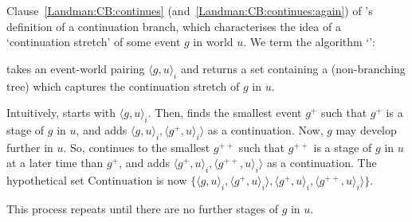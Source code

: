 \begin{note}[\AlgAC{}]
  Clause~\ref{Landman:CB:continues} (and~\ref{Landman:CB:continues:again}) of \citeauthor{Landman:1992wh}'s definition of a continuation branch, which characterises the idea of a `continuation stretch' of some event \(g\) in world \(u\).
  We term the algorithm `\AlgAC{}':

  \begin{algorithm}[H]
    \label{PrAl:g-a-c}
    \caption{\AlgAC{}}
    \SetAlgoLined
    \DontPrintSemicolon
  \end{algorithm}

  \AlgAC{} takes an event-world pairing \(\langle g,u \rangle_{i}\) and returns a set containing a (non-branching tree) which captures the continuation stretch of \(g\) in \(u\).

  Intuitively, \AlgAC{} starts with \(\langle g,u \rangle_{i}\).
  Then, \AlgAC{} finds the smallest event \(g^{+}\) such that \(g^{+}\) is a stage of \(g\) in \(u\), and adds \(\langle g,u \rangle_{i}, \langle g^{+},u \rangle_{i} \rangle\) as a continuation.
  Now, \(g\) may develop further in \(u\).
  So, \AlgAC{} continues to the smallest \(g^{++}\) such that \(g^{++}\) is a stage of \(g\) in \(u\) at a later time than \(g^{+}\), and adds \(\langle g^{+},u \rangle_{i}, \langle g^{++},u \rangle_{i} \rangle\) as a continuation.
  The hypothetical set \(\text{Continuation}\) is now \(\{\langle g,u \rangle_{i}, \langle g^{+},u \rangle_{i} \rangle, \langle g^{+},u \rangle_{i}, \langle g^{++},u \rangle_{i} \rangle\}\).

  This process repeats until there are no further stages of \(g\) in \(u\).
\end{note}

